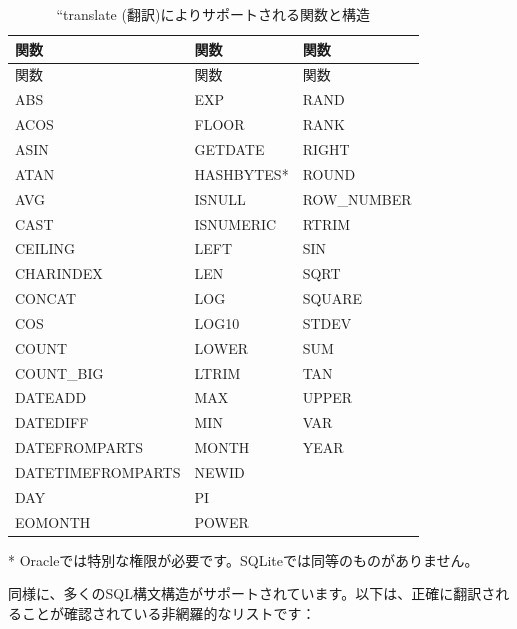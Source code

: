 \documentclass[
  11pt]{book}
\theoremstyle{definition}
\theoremstyle{definition}
\theoremstyle{definition}
\theoremstyle{definition}
\theoremstyle{remark}
\begin{document}
\begin{longtable}[]{@{}lll@{}}
\caption{\label{tab:sqlFunctions} ``translate (翻訳)によりサポートされる関数と構造}\tabularnewline
\toprule\noalign{}
関数 & 関数 & 関数 \\
\midrule\noalign{}
\endfirsthead
\toprule\noalign{}
関数 & 関数 & 関数 \\
\midrule\noalign{}
\endhead
\bottomrule\noalign{}
\endlastfoot
ABS & EXP & RAND \\
ACOS & FLOOR & RANK \\
ASIN & GETDATE & RIGHT \\
ATAN & HASHBYTES* & ROUND \\
AVG & ISNULL & ROW\_NUMBER \\
CAST & ISNUMERIC & RTRIM \\
CEILING & LEFT & SIN \\
CHARINDEX & LEN & SQRT \\
CONCAT & LOG & SQUARE \\
COS & LOG10 & STDEV \\
COUNT & LOWER & SUM \\
COUNT\_BIG & LTRIM & TAN \\
DATEADD & MAX & UPPER \\
DATEDIFF & MIN & VAR \\
DATEFROMPARTS & MONTH & YEAR \\
DATETIMEFROMPARTS & NEWID & \\
DAY & PI & \\
EOMONTH & POWER & \\
\end{longtable}

* Oracleでは特別な権限が必要です。SQLiteでは同等のものがありません。

同様に、多くのSQL構文構造がサポートされています。以下は、正確に翻訳されることが確認されている非網羅的なリストです：
\end{document}
